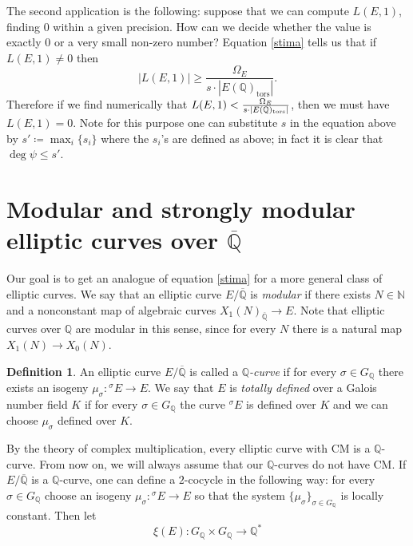 \documentclass[11pt]{amsart}
\theoremstyle{definition}
\newtheorem{definizione}{Definition}[section]
\begin{document}
		The second application is the following: suppose that we can compute $L(E,1)$, finding $0$ within a given precision. How can we decide whether the value is exactly $0$ or a very small non-zero number? Equation \ref{stima} tells us that if $L(E,1)\neq 0$ then
		\begin{equation}
		|L(E,1)|\geq \frac{\Omega_E}{s\cdot|E({\mathbb{Q}})_{\text{tors}}|}.
		\end{equation}
		Therefore if we find numerically that ${\displaystyle} L(E,1)<\frac{\Omega_E}{s\cdot|E({\mathbb{Q}})_{\text{tors}}|}$, then we must have $L(E,1)=0$. Note for this purpose one can substitute $s$ in the equation above by $s'\coloneqq \max_i\{s_i\}$ where the $s_i$'s are defined as above; in fact it is clear that $\deg\psi\leq s'$.

  	\section{Modular and strongly modular elliptic curves over
\texorpdfstring{${\overline{\mathbb{Q}}}$}{}}\label{strmod}
		Our goal is to get an analogue of equation \eqref{stima} for a more general class of elliptic curves. We say that an elliptic curve $E/{\overline{\mathbb{Q}}}$ is \emph{modular} if there exists $N\in {\mathbb{N}}$ and a nonconstant map of algebraic curves $X_1(N)_{\overline{\mathbb{Q}}}\to E$. Note that elliptic curves over ${\mathbb{Q}}$ are modular in this sense, since for every $N$ there is a natural map $X_1(N)\to X_0(N)$.
  			\begin{definizione}
				An elliptic curve $E/{\overline{\mathbb{Q}}}$ is called a \emph{${\mathbb{Q}}$-curve} if for every $\sigma \in{G_{\mathbb{Q}}}$ there exists an isogeny $\mu_{\sigma}\colon {{}^\sigma\!} E\to E$. We say that $E$ is \emph{totally defined} over a Galois number field $K$ if for every $\sigma \in {G_{\mathbb{Q}}}$ the curve ${{}^\sigma\!} E$ is defined over $K$ and we can choose $\mu_{\sigma}$ defined over $K$.
		\end{definizione}
		By the theory of complex multiplication, every elliptic curve with CM is a ${\mathbb{Q}}$-curve. From now on, we will always assume that our ${\mathbb{Q}}$-curves do not have CM.
		If $E/{\overline{\mathbb{Q}}}$ is a ${\mathbb{Q}}$-curve, one can define a $2$-cocycle in the following way: for every $\sigma\in {G_{\mathbb{Q}}}$ choose an isogeny $\mu_{\sigma}\colon {{}^\sigma\!} E\to E$ so that the system $\{\mu_{\sigma}\}_{\sigma\in {G_{\mathbb{Q}}}}$ is locally constant. Then let
		$$\xi(E)\colon {G_{\mathbb{Q}}}\times {G_{\mathbb{Q}}}\to {\mathbb{Q}}^*$$
\end{document}
